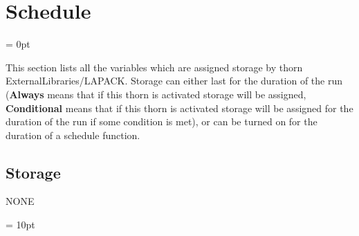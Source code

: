 
\section{Schedule} 


\parskip = 0pt


\noindent This section lists all the variables which are assigned storage by thorn ExternalLibraries/LAPACK.  Storage can either last for the duration of the run ({\bf Always} means that if this thorn is activated storage will be assigned, {\bf Conditional} means that if this thorn is activated storage will be assigned for the duration of the run if some condition is met), or can be turned on for the duration of a schedule function.


\subsection*{Storage}NONE

\vspace{5mm}\parskip = 10pt 
